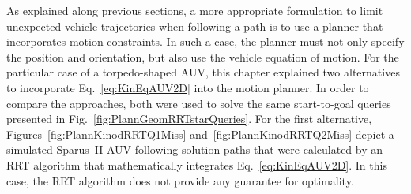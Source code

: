 As explained along previous sections, a more appropriate formulation to limit
unexpected vehicle trajectories when following a path is to use a planner that
incorporates motion constraints. In such a case, the planner must not only
specify the position and orientation, but also use the vehicle equation of
motion.
% 
For the particular case of a torpedo-shaped \ac{AUV}, this chapter explained two
alternatives to incorporate Eq.~\eqref{eq:KinEqAUV2D} into the motion planner.
In order to compare the approaches, both were used to solve the same
start-to-goal queries presented in Fig.~\ref{fig:PlannGeomRRTstarQueries}. For
the first alternative, Figures~\ref{fig:PlannKinodRRTQ1Miss}
and~\ref{fig:PlannKinodRRTQ2Miss} depict a simulated Sparus~II \ac{AUV}
following solution paths that were calculated by an \ac{RRT} algorithm that
mathematically integrates Eq.~\eqref{eq:KinEqAUV2D}. In this case, the \ac{RRT}
algorithm does not provide any guarantee for optimality.

